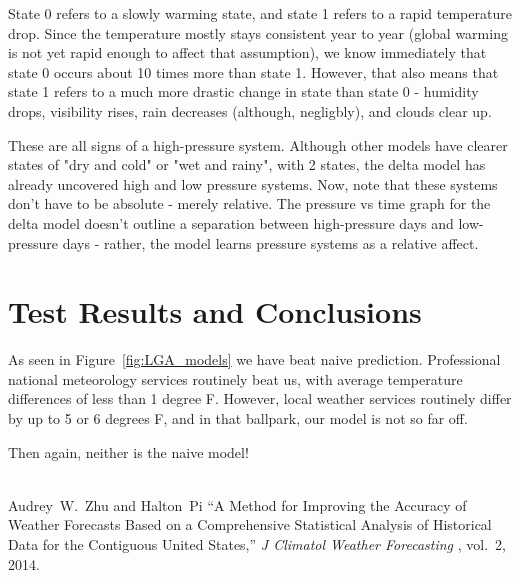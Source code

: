 \documentclass[a4paper]{article}
\begin{document}
State 0 refers to a slowly warming state, and state 1 refers to a rapid temperature drop. Since the temperature mostly stays consistent year to year (global warming is not yet rapid enough to affect that assumption), we know immediately that state 0 occurs about 10 times more than state 1. However, that also means that state 1 refers to a much more drastic change in state than state 0 - humidity drops, visibility rises, rain decreases (although, negligbly), and clouds clear up.

These are all signs of a high-pressure system. Although other models have clearer states of "dry and cold" or "wet and rainy", with 2 states, the delta model has already uncovered high and low pressure systems. Now, note that these systems don't have to be absolute - merely relative. The pressure vs time graph for the delta model doesn't outline a separation between high-pressure days and low-pressure days - rather, the model learns pressure systems as a relative affect.



\section{Test Results and Conclusions}
As seen in Figure~\ref{fig:LGA_models} we have beat naive prediction. Professional national meteorology services routinely beat us, with average temperature differences of less than 1 degree F. However, local weather services routinely differ by up to 5 or 6 degrees F, and in that ballpark, our model is not so far off. 

Then again, neither is the naive model!
\\
\qquad
\\
\qquad




























\begin{thebibliography}{9}
  Audrey\ W.\ Zhu and Halton\ Pi
  ``A Method for Improving the Accuracy of Weather Forecasts Based on a Comprehensive Statistical Analysis of Historical Data for the Contiguous United States,''
  \textit{ J Climatol Weather Forecasting }, vol.~2, 2014.
\end{thebibliography}
\end{document}
